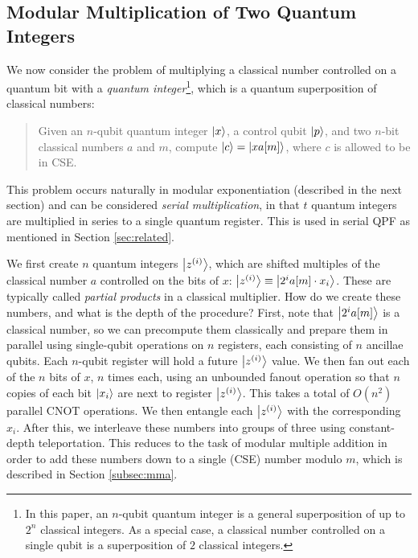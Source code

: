 \documentclass[twoside]{article}
\begin{document}
\subsection{Modular Multiplication of Two Quantum Integers}
\label{subsec:csa-mod-mult-qq}

We now consider the problem of multiplying a classical number controlled
on a quantum bit with a
\emph{quantum integer}\footnote{In this paper, an $n$-qubit 
quantum integer is a
general superposition of up to $2^n$ classical integers. As a special case,
a classical number controlled on a single qubit is a superposition of
$2$ classical integers.},
which is a
quantum superposition of classical numbers:

\begin{quote}
Given an $n$-qubit quantum integer $\left\vert{x}\right\rangle$, a control qubit $\left\vert{p}\right\rangle$,
and two $n$-bit classical numbers $a$
and $m$,
compute $\left\vert{c}\right\rangle = \left\vert{xa[m]}\right\rangle$, where $c$ is allowed to be in CSE.
\end{quote}

This problem occurs naturally in modular exponentiation (described in
the next section) and can be considered \emph{serial multiplication},
in that $t$ quantum integers are multiplied in series to a single
quantum register. This is used in serial QPF as mentioned in
Section \ref{sec:related}.


We first create $n$ quantum integers $\left\vert{z^{(i)}}\right\rangle$,
which are shifted multiples of the classical number $a$ controlled on the bits
of $x$:
$\left\vert{z^{(i)}}\right\rangle \equiv \left\vert{2^i a[m] \cdot x_i }\right\rangle$.
These are typically called \emph{partial products} in a classical multiplier.
How do we create these numbers, and what is the depth of the procedure?
First, note that $\left\vert{2^i a[m]}\right\rangle$ is a classical number, so we can
precompute them classically and prepare them in parallel using single-qubit
operations
on $n$ registers, each consisting of $n$ ancillae qubits. Each $n$-qubit
register will hold a future $\left\vert{z^{(i)}}\right\rangle$ value.
We then fan out each of the
$n$ bits of $x$, $n$ times each, using an unbounded fanout operation so that
$n$ copies of each bit $\left\vert{x_i}\right\rangle$ are next to register $\left\vert{z^{(i)}}\right\rangle$.
This takes a total of $O(n^2)$ parallel CNOT operations.
We then entangle each $\left\vert{z^{(i)}}\right\rangle$ with the corresponding $x_i$.
After this, we interleave these numbers into groups of three using
constant-depth teleportation. This reduces to the task of modular
multiple addition in order to add these numbers down to a single
(CSE) number modulo $m$, which is described in Section \ref{subsec:mma}.
\end{document}
